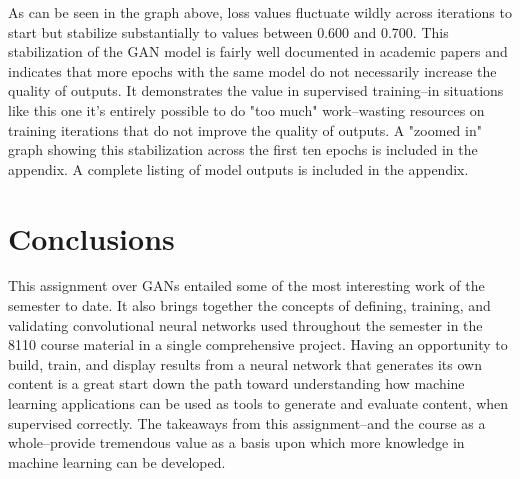 \documentclass{article}
\begin{document}
\par As can be seen in the graph above, loss values fluctuate wildly across iterations to start but stabilize substantially to values between 0.600 and 0.700.
This stabilization of the GAN model is fairly well documented in academic papers and indicates that more epochs with the same model do not necessarily increase the quality of outputs.
It demonstrates the value in supervised training--in situations like this one it's entirely possible to do "too much" work--wasting resources on training iterations that do not improve the quality of outputs.
A "zoomed in" graph showing this stabilization across the first ten epochs is included in the  appendix.
A complete listing of model outputs is included in the  appendix.

\section{Conclusions}
\par This assignment over GANs entailed some of the most interesting work of the semester to date.
It also brings together the concepts of defining, training, and validating convolutional neural networks used throughout the semester in the 8110 course material in a single comprehensive project.
Having an opportunity to build, train, and display results from a neural network that generates its own content is a great start down the path toward understanding how machine learning applications can be used as tools to generate and evaluate content, when supervised correctly.
The takeaways from this assignment--and the course as a whole--provide tremendous value as a basis upon which more knowledge in machine learning can be developed.
% 
% 
\end{document}
